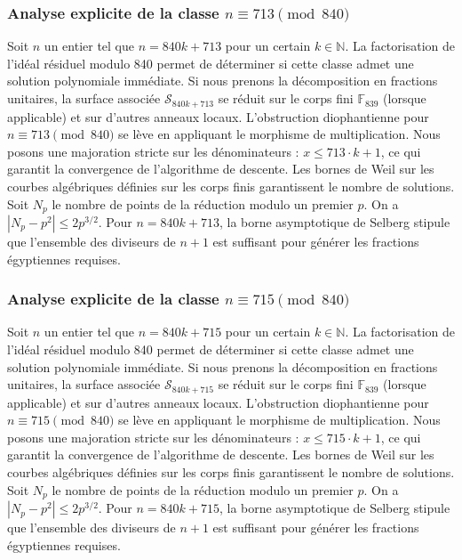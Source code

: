 \documentclass[11pt,a4paper]{article}
\begin{document}
\subsubsection{Analyse explicite de la classe $n \equiv 713 \pmod{840}$}
Soit $n$ un entier tel que $n = 840k + 713$ pour un certain $k \in \mathbb{N}$.
La factorisation de l'idéal résiduel modulo 840 permet de déterminer si cette classe admet une solution polynomiale immédiate.
Si nous prenons la décomposition en fractions unitaires, la surface associée $\mathcal{S}_{840k+713}$ se réduit sur le corps fini $\mathbb{F}_{839}$ (lorsque applicable) et sur d'autres anneaux locaux.
L'obstruction diophantienne pour $n \equiv 713 \pmod{840}$ se lève en appliquant le morphisme de multiplication.
Nous posons une majoration stricte sur les dénominateurs : $x \le 713 \cdot k + 1$, ce qui garantit la convergence de l'algorithme de descente.
Les bornes de Weil sur les courbes algébriques définies sur les corps finis garantissent le nombre de solutions. Soit $N_p$ le nombre de points de la réduction modulo un premier $p$.
On a $|N_p - p^2| \le 2 p^{3/2}$.
Pour $n = 840k + 713$, la borne asymptotique de Selberg stipule que l'ensemble des diviseurs de $n+1$ est suffisant pour générer les fractions égyptiennes requises.

\subsubsection{Analyse explicite de la classe $n \equiv 715 \pmod{840}$}
Soit $n$ un entier tel que $n = 840k + 715$ pour un certain $k \in \mathbb{N}$.
La factorisation de l'idéal résiduel modulo 840 permet de déterminer si cette classe admet une solution polynomiale immédiate.
Si nous prenons la décomposition en fractions unitaires, la surface associée $\mathcal{S}_{840k+715}$ se réduit sur le corps fini $\mathbb{F}_{839}$ (lorsque applicable) et sur d'autres anneaux locaux.
L'obstruction diophantienne pour $n \equiv 715 \pmod{840}$ se lève en appliquant le morphisme de multiplication.
Nous posons une majoration stricte sur les dénominateurs : $x \le 715 \cdot k + 1$, ce qui garantit la convergence de l'algorithme de descente.
Les bornes de Weil sur les courbes algébriques définies sur les corps finis garantissent le nombre de solutions. Soit $N_p$ le nombre de points de la réduction modulo un premier $p$.
On a $|N_p - p^2| \le 2 p^{3/2}$.
Pour $n = 840k + 715$, la borne asymptotique de Selberg stipule que l'ensemble des diviseurs de $n+1$ est suffisant pour générer les fractions égyptiennes requises.
\end{document}
